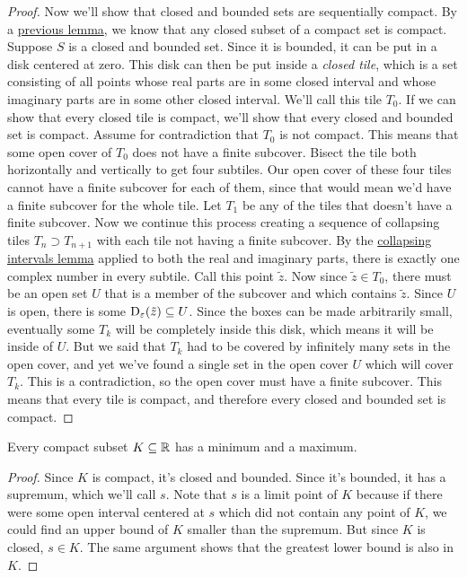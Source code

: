 \begin{proof}
Now we'll show that closed and bounded sets are sequentially compact. By a \hyperlink{Closed Subsets of Compact Sets}{previous lemma}, we know that any closed subset of a compact set is compact. Suppose $S$ is a closed and bounded set. Since it is bounded, it can be put in a disk centered at zero. This disk can then be put inside a \emph{closed tile}, which is a set consisting of all points whose real parts are in some closed interval and whose imaginary parts are in some other closed interval. We'll call this tile $T_0$. If we can show that every closed tile is compact, we'll show that every closed and bounded set is compact. Assume for contradiction that $T_0$ is not compact. This means that some open cover of $T_0$ does not have a finite subcover. Bisect the tile both horizontally and vertically to get four subtiles. Our open cover of these four tiles cannot have a finite subcover for each of them, since that would mean we'd have a finite subcover for the whole tile. Let $T_1$ be any of the tiles that doesn't have a finite subcover. Now we continue this process creating a sequence of collapsing tiles $T_n \supset T_{n+1}$ with each tile not having a finite subcover. By the \hyperlink{Collapsing Intervals Lemma}{collapsing intervals lemma} applied to both the real and imaginary parts, there is exactly one complex number in every subtile. Call this point $\tilde{z}$. Now since $\tilde{z} \in T_0$, there must be an open set $U$ that is a member of the subcover and which contains $\tilde{z}$. Since $U$ is open, there is some $\operatorname{D_{\varepsilon}} ({\tilde{z}}) \subseteq U$. Since the boxes can be made arbitrarily small, eventually some $T_k$ will be completely inside this disk, which means it will be inside of $U$. But we said that $T_k$ had to be covered by infinitely many sets in the open cover, and yet we've found a single set in the open cover $U$ which will cover $T_k$. This is a contradiction, so the open cover must have a finite subcover. This means that every tile is compact, and therefore every closed and bounded set is compact.
\end{proof}
\begin{corollary}
Every compact subset $K \subseteq \mathbb{R}$ has a minimum and a maximum.
\end{corollary}
\begin{proof}
Since $K$ is compact, it's closed and bounded. Since it's bounded, it has a supremum, which we'll call $s$. Note that $s$ is a limit point of $K$ because if there were some open interval centered at $s$ which did not contain any point of $K$, we could find an upper bound of $K$ smaller than the supremum. But since $K$ is closed, $s \in K$. The same argument shows that the greatest lower bound is also in $K$.
\end{proof}
